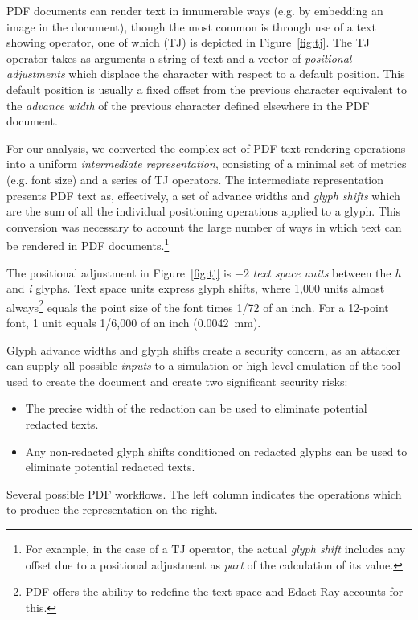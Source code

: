 PDF documents can render text in innumerable ways (e.g. by embedding an image in the document), though the most common is through use of a text showing operator, one of which (TJ) is depicted in Figure~\ref{fig:tj}.
The TJ operator takes as arguments a string of text and a vector of \emph{positional adjustments} which displace the character with respect to a default position.
This default position is usually a fixed offset from the previous character equivalent to the \emph{advance width} of the previous character defined elsewhere in the PDF document.

For our analysis, we converted the complex set of PDF text rendering operations into a uniform \emph{intermediate representation}, consisting of a minimal set of metrics (e.g. font size) and a series of TJ operators.
The intermediate representation presents PDF text as, effectively, a set of advance widths and \emph{glyph shifts} which are the sum of all the individual positioning operations applied to a glyph.
This conversion was necessary to account the large number of ways in which text can be rendered in PDF documents.\footnote{For example, in the case of a TJ operator, the actual \emph{glyph shift} includes any offset due to a positional adjustment as \emph{part} of the calculation of its value.}

The positional adjustment in Figure~\ref{fig:tj} is $-2$ \emph{text space units} between the \emph{h} and \emph{i} glyphs.
Text space units express glyph shifts, where 1,000 units almost always\footnote{PDF offers the ability to redefine the text space and Edact-Ray accounts for this.} equals the point size of the font times 1/72 of an inch.
For a 12-point font, 1 unit equals 1/6,000 of an inch (0.0042~mm).

Glyph advance widths and glyph shifts create a security concern, as an attacker can supply all possible \emph{inputs} to a simulation or high-level emulation of the tool used to create the document and create two significant security risks:

\begin{itemize}
    \item The precise width of the redaction can be used to eliminate potential redacted texts.
    \item Any non-redacted glyph shifts conditioned on redacted glyphs can be used to eliminate potential redacted texts.
\end{itemize}

\begin{table}
	\footnotesize
  \centering
  \caption{Several possible PDF workflows. The left column indicates the operations which to produce the representation on the right.}
  \label{tab:flows}
  
\end{table}

